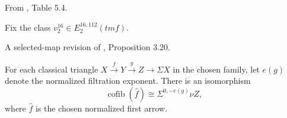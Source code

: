 \begin{definition}
\label{frontier:Literature:19f82a11f795}
From \cite{BR21}, Table 5.4.\par

Fix the class $v_2^{16}\in E_2^{16,112}(\mathit{tmf})$.
\end{definition}

\begin{definition}
\label{frontier:Literature:1aa6a10db546}
A selected-map revision of \cite{LWX126}, Proposition 3.20.\par

For each classical triangle $X\xrightarrow{f}Y\xrightarrow{g}Z\to\Sigma X$ in the chosen family, let $e(g)$ denote the normalized filtration exponent. There is an isomorphism\[\operatorname{cofib}(\widehat f)\cong\Sigma^{0,-e(g)}\nu Z,\]where $\widehat f$ is the chosen normalized first arrow.
\end{definition}

